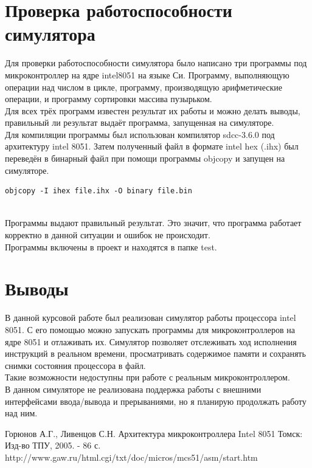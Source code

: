 \section{Проверка работоспособности симулятора}
Для проверки работоспособности симулятора было написано три программы под микроконтроллер на ядре intel8051 на языке Си. Программу, выполняющую операции над числом в цикле, программу, производящую арифметические операции, и программу сортировки массива пузырьком. \\
Для всех трёх программ известен результат их работы и можно делать выводы, правильный ли результат выдаёт программа, запущенная на симуляторе. \\
Для компиляции программы был использован компилятор sdcc-3.6.0 под архитектуру intel 8051. Затем полученный файл в формате intel hex (.ihx) был переведён в бинарный файл при помощи программы objcopy и запущен на симуляторе. \\
\begin{lstlisting}
objcopy -I ihex file.ihx -O binary file.bin
\end{lstlisting}
~\\
Программы выдают правильный результат. Это значит, что программа работает корректно в данной ситуации и ошибок не происходит. \\
Программы включены в проект и  находятся в папке test.

\newpage

\section{Выводы}
В данной курсовой работе был реализован симулятор работы процессора intel 8051. С его помощью можно запускать программы для микроконтроллеров на ядре 8051 и отлаживать их. Симулятор позволяет отслеживать ход исполнения инструкций в реальном времени, просматривать содержимое памяти и сохранять снимки состояния процессора в файл. \\ Такие возможности недоступны при работе с реальным микроконтроллером. \\
В данном симуляторе не реализована поддержка работы с внешними интерфейсами ввода/вывода и прерываниями, но я планирую продолжать работу над ним. \\

\begin{thebibliography}{}
    \bibitem{} Горюнов А.Г., Ливенцов С.Н. Архитектура микроконтроллера Intel 8051 Томск: Изд-во ТПУ, 2005. - 86 с.
    \bibitem{} http://www.gaw.ru/html.cgi/txt/doc/micros/mcs51/asm/start.htm
\end{thebibliography}


